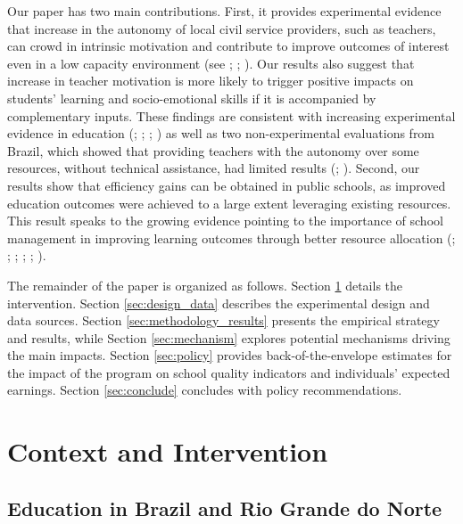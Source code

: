 \documentclass[11pt,a4paper]{article}
\begin{document}
Our paper has two main contributions. First, it provides experimental evidence that increase in the autonomy of local civil service providers, such as teachers, can crowd in intrinsic motivation and contribute to improve outcomes of interest even in a low capacity environment (see \citealp{rasul2018managementof}; \citealp{rasul2018managementand}; \citealp{bandiera2020allocation}). Our results also suggest that increase in teacher motivation is more likely to trigger positive impacts on students' learning and socio-emotional skills if it is accompanied by complementary inputs. These findings are consistent with increasing experimental evidence in education (\citealp{WDR2018}; \citealp{gilligan2018educator}; \citealp{andrew2019preschool}; \citealp{mbiti2019inputs}) as well as two non-experimental evaluations from Brazil, which showed that providing teachers with the autonomy over some resources, without technical assistance, had limited results (\citealp{almeida2016assessing}; \citealp{de2016impacto}). Second, our results show that efficiency gains can be obtained in public schools, as improved education outcomes were achieved to a large extent leveraging existing resources. This result speaks to the growing evidence pointing to the importance of school management in improving learning outcomes through better resource allocation (\citealp{abdulkadirouglu2011accountability}; \citealp{dobbie2013getting}; \citealp{rockoff2012information}; \citealp{taylor2012effect}; \citealp{fryer2014injecting}; \citealp{fryer2017management}).  

The remainder of the paper is organized as follows. Section \ref{sec:context} details the intervention. Section \ref{sec:design_data} describes the experimental design and data sources. Section \ref{sec:methodology_results} presents the empirical strategy and results, while Section \ref{sec:mechanism} explores potential mechanisms driving the main impacts. Section \ref{sec:policy} provides back-of-the-envelope estimates for the impact of the program on school quality indicators and individuals' expected earnings. Section \ref{sec:conclude} concludes with policy recommendations.



\section{Context and Intervention} \label{sec:context}

\subsection{Education in Brazil and Rio Grande do Norte} \label{sec:brazil}
\end{document}
